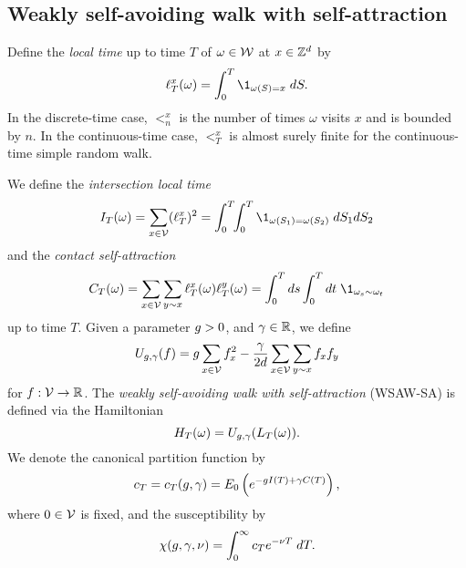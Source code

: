 
\subsection{Weakly self-avoiding walk with self-attraction}

Define the \emph{local time} up to time $T$ of $\omega \in \mathcal{W}$ at
$x \in { {{\mathbb Z}}^d }$ by
\begin{equation}
\lt^x_T(\omega) = \int_0^T \1_{\omega(S)=x} \; dS.
\end{equation}
In the discrete-time case, $\lt^x_n$ is the number of times $\omega$ visits $x$
and is bounded by $n$. In the continuous-time case, $\lt^x_T$ is almost surely
finite for the continuous-time simple random walk.

We define the \emph{intersection local time}
\begin{equation}
\label{e:ITdef}
I_T(\omega) = \sum_{x\in\vertices} (\lt^x_T)^2
  =
\int_0^T \!\! \int_0^T \1_{\omega(S_1)=\omega(S_2)} \; dS_1 dS_2
\end{equation}
and the \emph{contact self-attraction}
\begin{equation}
\label{e:CTdef}
C_T(\omega) =
  \sum_{x \in \vertices} \sum_{y \sim x} \lt_T^x(\omega) \lt_T^y(\omega)
  = \int_0^T ds \int_0^T dt \; \1_{\omega_{s} \sim \omega_{t}}
\end{equation}
up to time $T$.
Given a parameter $g > 0$,
and $\gamma \in {\mathbb R}$, we define
\begin{equation}
\label{e:Udef-neg}
U_{g,\gamma}(f)
=
g \sum_{x\in\mathcal{V}} f_x^2
- \frac{\gamma}{2d}
\sum_{x\in\mathcal{V}} \sum_{y \sim x} f_x f_y
\end{equation}
for $f : \mathcal{V} \rightarrow {\mathbb R}$.
The \emph{weakly self-avoiding walk with self-attraction} (WSAW-SA) is defined via the Hamiltonian
\begin{equation}
H_T(\omega) = U_{g,\gamma}(L_T(\omega)).
\end{equation}
We denote the canonical partition function by
\begin{equation}
c_T = c_T(g, \gamma) = E_0 \left( e^{-g I(T) + \gamma C(T)} \right),
\end{equation}
where $0 \in \mathcal{V}$ is fixed, and the susceptibility by
\begin{equation}
\chi(g, \gamma, \nu) = \int_0^\infty c_T e^{-\nu T} \; dT.
\end{equation}

